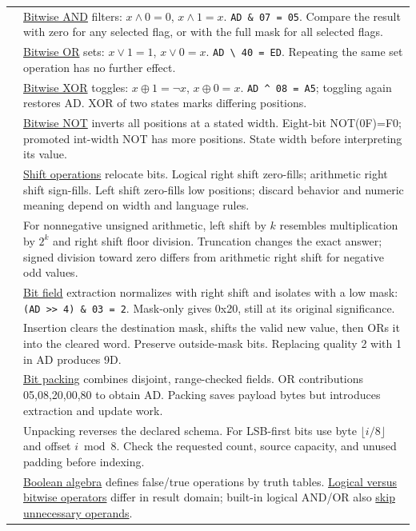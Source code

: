 {\begin{longtable}[]{@{}
  >{\raggedright\arraybackslash}p{}
  >{\raggedright\arraybackslash}p{}@{}}
9 & \hyperref[appendix-68b52453737c]{Bitwise AND} filters: \(x\land0=0\), \(x\land1=x\). \texttt{AD\ \&\ 07\ =\ 05}. Compare the result with zero for any selected flag, or with the full mask for all selected flags. \\
10 & \hyperref[appendix-a427ce8ce8a6]{Bitwise OR} sets: \(x\lor1=1\), \(x\lor0=x\). \texttt{AD\ \textbackslash{}\textbar{}\ 40\ =\ ED}. Repeating the same set operation has no further effect. \\
11 & \hyperref[appendix-d49161831368]{Bitwise XOR} toggles: \(x\oplus1=\neg x\), \(x\oplus0=x\). \texttt{AD\ \^{}\ 08\ =\ A5}; toggling again restores AD. XOR of two states marks differing positions. \\
12 & \hyperref[appendix-8f38927cfc54]{Bitwise NOT} inverts all positions at a stated width. Eight-bit NOT(0F)=F0; promoted int-width NOT has more positions. State width before interpreting its value. \\
13 & \hyperref[appendix-73425b25118e]{Shift operations} relocate bits. Logical right shift zero-fills; arithmetic right shift sign-fills. Left shift zero-fills low positions; discard behavior and numeric meaning depend on width and language rules. \\
14 & For nonnegative unsigned arithmetic, left shift by \(k\) resembles multiplication by \(2^k\) and right shift floor division. Truncation changes the exact answer; signed division toward zero differs from arithmetic right shift for negative odd values. \\
15 & \hyperref[appendix-ac697f5c66e8]{Bit field} extraction normalizes with right shift and isolates with a low mask: \texttt{(AD\ \textgreater{}\textgreater{}\ 4)\ \&\ 03\ =\ 2}. Mask-only gives 0x20, still at its original significance. \\
16 & Insertion clears the destination mask, shifts the valid new value, then ORs it into the cleared word. Preserve outside-mask bits. Replacing quality 2 with 1 in AD produces 9D. \\
17 & \hyperref[appendix-1f9963e1a5d1]{Bit packing} combines disjoint, range-checked fields. OR contributions 05,08,20,00,80 to obtain AD. Packing saves payload bytes but introduces extraction and update work. \\
18 & Unpacking reverses the declared schema. For LSB-first bits use byte \(\lfloor i/8\rfloor\) and offset \(i\bmod8\). Check the requested count, source capacity, and unused padding before indexing. \\
19 & \hyperref[appendix-24475e1596a8]{Boolean algebra} defines false/true operations by truth tables. \hyperref[appendix-fe6b457d68d8]{Logical versus bitwise operators} differ in result domain; built-in logical AND/OR also \hyperref[appendix-2e245a6fa8d3]{skip unnecessary operands}. \\

\end{longtable}}
